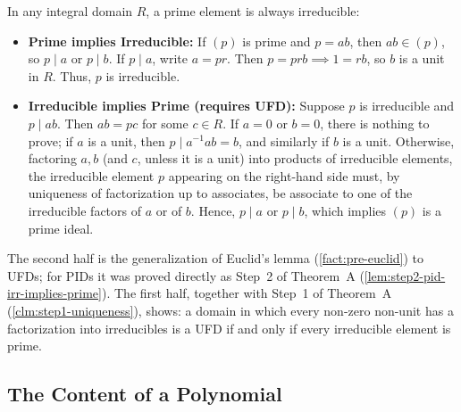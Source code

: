 \begin{content}

\begin{steps}
In any integral domain $R$, a prime element is always irreducible:
\begin{itemize}
    \item \textbf{Prime implies Irreducible:} If $(p)$ is prime and $p = ab$, then $ab \in (p)$, so $p \mid a$ or $p \mid b$. If $p \mid a$, write $a = pr$. Then $p = prb \implies 1 = rb$, so $b$ is a unit in $R$. Thus, $p$ is irreducible.
    \item \textbf{Irreducible implies Prime (requires UFD):} Suppose $p$ is irreducible and $p \mid ab$. Then $ab = pc$ for some $c \in R$. If $a = 0$ or $b = 0$, there is nothing to prove; if $a$ is a unit, then $p \mid a^{-1} a b = b$, and similarly if $b$ is a unit. Otherwise, factoring $a, b$ (and $c$, unless it is a unit) into products of irreducible elements, the irreducible element $p$ appearing on the right-hand side must, by uniqueness of factorization up to associates, be associate to one of the irreducible factors of $a$ or of $b$. Hence, $p \mid a$ or $p \mid b$, which implies $(p)$ is a prime ideal.
\end{itemize}
The second half is the generalization of Euclid's lemma (\cref{fact:pre-euclid}) to UFDs; for PIDs it was proved directly as Step~2 of Theorem~A (\cref{lem:step2-pid-irr-implies-prime}). The first half, together with Step~1 of Theorem~A (\cref{clm:step1-uniqueness}), shows: a domain in which every non-zero non-unit has a factorization into irreducibles is a UFD if and only if every irreducible element is prime.
\end{steps}
\end{content}

\subsection{The Content of a Polynomial}

